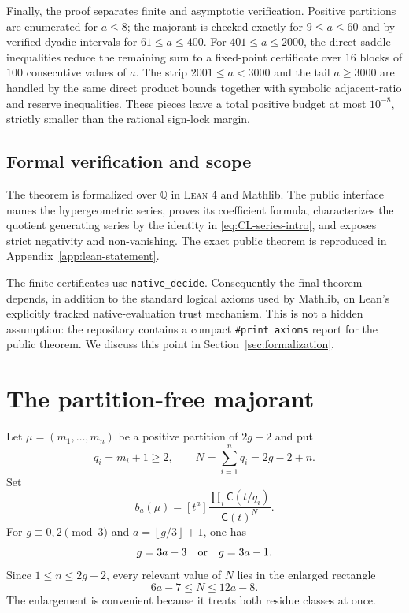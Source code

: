 \documentclass[11pt]{article}
\theoremstyle{definition}
\theoremstyle{remark}
\newcommand{\C}{\mathsf C}
\newcommand{\Q}{\mathbb Q}
\newcommand{\floor}[1]{\left\lfloor #1\right\rfloor}
\newcommand{\Lean}{\textsc{Lean}}
\newcommand{\code}[1]{\texttt{#1}}
\begin{document}
Finally, the proof separates finite and asymptotic verification.  Positive
partitions are enumerated for $a\le8$; the majorant is checked exactly for
$9\le a\le60$ and by verified dyadic intervals for $61\le a\le400$.  For
$401\le a\le2000$, the direct saddle inequalities reduce the remaining sum
to a fixed-point certificate over $16$ blocks of $100$ consecutive values of
$a$.  The strip $2001\le a<3000$ and the tail $a\ge3000$ are handled by the
same direct product bounds together with symbolic adjacent-ratio and reserve
inequalities.  These pieces leave a total positive budget at most $10^{-8}$,
strictly smaller than the rational sign-lock margin.

\subsection{Formal verification and scope}

The theorem is formalized over $\Q$ in \Lean{} 4 and Mathlib.  The public
interface names the hypergeometric series, proves its coefficient formula,
characterizes the quotient generating series by the identity in
\eqref{eq:CL-series-intro}, and exposes strict negativity and non-vanishing.
The exact public theorem is reproduced in Appendix~\ref{app:lean-statement}.

The finite certificates use \code{native\_decide}.  Consequently the final
theorem depends, in addition to the standard logical axioms used by Mathlib,
on Lean's explicitly tracked native-evaluation trust mechanism.  This is not
a hidden assumption: the repository contains a compact \code{\#print axioms}
report for the public theorem.  We discuss this point in
Section~\ref{sec:formalization}.

\section{The partition-free majorant}\label{sec:majorant}

Let $\mu=(m_1,\ldots,m_n)$ be a positive partition of $2g-2$ and put
\begin{equation}\label{eq:qN}
  q_i=m_i+1\ge2,
  \qquad
  N=\sum_{i=1}^nq_i=2g-2+n.
\end{equation}
Set
\begin{equation}\label{eq:bdef}
  b_a(\mu)=[t^a]\frac{\prod_i\C(t/q_i)}{\C(t)^N}.
\end{equation}
For $g\equiv0,2\pmod3$ and $a=\floor{g/3}+1$, one has
\[
  g=3a-3\quad\hbox{or}\quad g=3a-1.
\]
Since $1\le n\le2g-2$, every relevant value of $N$ lies in the enlarged
rectangle
\begin{equation}\label{eq:rectangle}
  6a-7\le N\le12a-8.
\end{equation}
The enlargement is convenient because it treats both residue classes at once.
\end{document}
